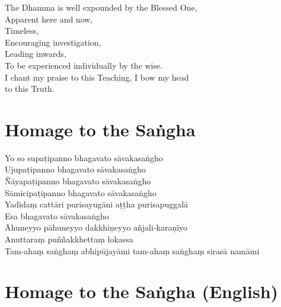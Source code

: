 \begin{leader}
\end{leader}

The Dhamma is well expounded by the Blessed One,\\
Apparent here and now,\\
Timeless,\\
Encouraging investigation,\\
Leading inwards,\\
To be experienced individually by the wise.\\
I chant my praise to this Teaching, I bow my head\\ to this Truth.

\section*{Homage to the Saṅgha}

\begin{leader}
\end{leader}

Yo so supaṭipanno bhagavato sāvakasaṅgho\\
Ujupaṭipanno bhagavato sāvakasaṅgho\\
Ñāyapaṭipanno bhagavato sāvakasaṅgho\\
Sāmīcipaṭipanno bhagavato sāvakasaṅgho\\
Yadidaṃ cattāri purisayugāni aṭṭha purisapuggalā\\
Esa bhagavato sāvakasaṅgho\\
Āhuneyyo pāhuneyyo dakkhiṇeyyo añjali-karaṇīyo\\
Anuttaraṃ puññakkhettaṃ lokassa\\
Tam-ahaṃ saṅghaṃ abhipūjayāmi tam-ahaṃ saṅghaṃ sirasā namāmi

\section*{Homage to the Saṅgha (English)}

\begin{leader}
\end{leader}

